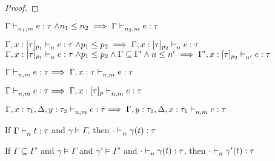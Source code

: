 \documentclass{article}
\begin{document}
\begin{proof}
\end{proof}

\begin{lemma} 
	\label{lem:deweaken1}
	$\Gamma \mathrel{\vdash_{n_1,m}^{} {e} : {\tau}} \land n_1 \leq n_2 \implies \Gamma \mathrel{\vdash_{n_2,m}^{} {e} : {\tau}}$\\
\end{lemma}

\begin{lemma} 
	\label{lem:deweaken2}
	$\Gamma, x:[\tau]_{p_1} \mathrel{\vdash_{n}^{} {e} : {\tau}} \land p_1 \leq p_2 \implies \Gamma, x:[\tau]_{p_2} \mathrel{\vdash_{n}^{} {e} : {\tau}} $\\
	$\Gamma, x:[\tau]_{p_1} \mathrel{\vdash_{n}^{} {e} : {\tau}} \land p_1 \leq p_2 \land \Gamma \subseteq \Gamma' \land n \leq n' \implies \Gamma', x:[\tau]_{p_2} \mathrel{\vdash_{n'}^{} {e} : {\tau}} $\\
\end{lemma}

\begin{lemma}
    \label{lem:coweaken1}
    $\Gamma \mathrel{\vdash_{n,m}^{} {e} : {\tau}}  \implies \Gamma, x:\tau \mathrel{\vdash_{n,m}^{} {e} : {\tau}} $\\
\end{lemma}

\begin{lemma}
    \label{lem:coweaken2}
    $\Gamma \mathrel{\vdash_{n,m}^{} {e} : {\tau}}  \implies \Gamma, x:[\tau]_p \mathrel{\vdash_{n,m}^{} {e} : {\tau}} $\\
\end{lemma}

\begin{lemma}
    \label{lem:coex}
    $\Gamma, x : \tau_1, \Delta, y : \tau_2 \mathrel{\vdash_{n,m}^{} {e} : {\tau}}  \implies \Gamma, y : \tau_2, \Delta, x : \tau_1 \mathrel{\vdash_{n,m}^{} {e} : {\tau}} $\\
\end{lemma}

\begin{lemma}
	\label{lem:sub}
	If $\Gamma \mathrel{\vdash_{n}^{} {t} : {\tau}}$ and $\gamma \vDash \Gamma$, then $ \cdot \mathrel{\vdash_{n}^{} {\gamma(t)} : {\tau}} $\\
\end{lemma}

\begin{lemma}
	\label{lem:subext}
	If $\Gamma \subseteq \Gamma'$ and $\gamma \vDash \Gamma$ and $\gamma' \vDash \Gamma'$ and $ \cdot \mathrel{\vdash_{n}^{} {\gamma(t)} : {\tau}} $, then $ \cdot \mathrel{\vdash_{n}^{} {\gamma'(t)} : {\tau}} $ \\
\end{lemma}
\end{document}
